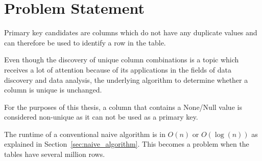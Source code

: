 \chapter{Problem Statement}\label{chap:problem_statement} %
Primary key candidates are columns which do not have any duplicate values and can therefore be used to identify a row in the table.

Even though the discovery of unique column combinations is a topic which receives a lot of attention because of its applications in the fields of data discovery and data analysis, the underlying algorithm to determine whether a column is unique is unchanged.

For the purposes of this thesis, a column that contains a None/Null value is considered non-unique as it can not be used as a primary key.

The runtime of a conventional naive algorithm is in \(O(n)\) or \(O(\log(n))\) as explained in Section~\ref{sec:naive_algorithm}. This becomes a problem when the tables have several million rows.

